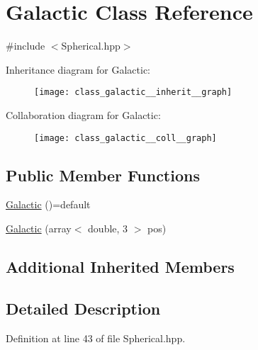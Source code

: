 \hypertarget{class_galactic}{\section{Galactic Class Reference}
\label{class_galactic}
}


{\ttfamily \#include $<$Spherical.\-hpp$>$}



Inheritance diagram for Galactic\-:\nopagebreak
\begin{figure}[H]
\begin{center}
\leavevmode
\texttt{[image: class\_galactic\_\_inherit\_\_graph]}
\end{center}
\end{figure}


Collaboration diagram for Galactic\-:\nopagebreak
\begin{figure}[H]
\begin{center}
\leavevmode
\texttt{[image: class\_galactic\_\_coll\_\_graph]}
\end{center}
\end{figure}
\subsection*{Public Member Functions}
\begin{DoxyCompactItemize}
\item 
\hyperlink{class_galactic_adb8910a11762d017934147c1105a2f25}{Galactic} ()=default
\item 
\hyperlink{class_galactic_ae554ae637bdabd965c41ce5ce05b8b8b}{Galactic} (array$<$ double, 3 $>$ pos)
\end{DoxyCompactItemize}
\subsection*{Additional Inherited Members}


\subsection{Detailed Description}


Definition at line 43 of file Spherical.\-hpp.



